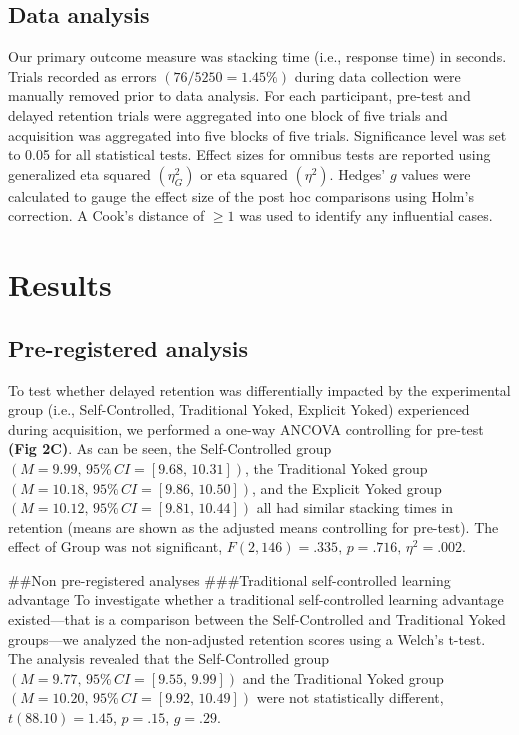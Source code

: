 \documentclass[
  english,
  jou]{apa7}
\begin{document}
\hypertarget{data-analysis}{%
\subsection{Data analysis}\label{data-analysis}}

Our primary outcome measure was stacking time (i.e., response time) in seconds. Trials recorded as errors \((76/5250 = 1.45\%)\) during data collection were manually removed prior to data analysis. For each participant, pre-test and delayed retention trials were aggregated into one block of five trials and acquisition was aggregated into five blocks of five trials. Significance level was set to 0.05 for all statistical tests. Effect sizes for omnibus tests are reported using generalized eta squared \((\eta^2_{G})\) or eta squared \((\eta^2)\). Hedges' \(g\) values were calculated to gauge the effect size of the post hoc comparisons using Holm's correction. A Cook's distance of \(\geq 1\) was used to identify any influential cases.

\hypertarget{results}{%
\section{Results}\label{results}}

\hypertarget{pre-registered-analysis}{%
\subsection{Pre-registered analysis}\label{pre-registered-analysis}}

To test whether delayed retention was differentially impacted by the experimental group (i.e., Self-Controlled, Traditional Yoked, Explicit Yoked) experienced during acquisition, we performed a one-way ANCOVA controlling for pre-test \textbf{(Fig 2C)}. As can be seen, the Self-Controlled group \((M = 9.99, \,95\% \,CI = [9.68, \,10.31])\), the Traditional Yoked group \((M = 10.18, \,95\% \,CI = [9.86, \,10.50])\), and the Explicit Yoked group \((M = 10.12, \,95\% \,CI = [9.81, \,10.44])\) all had similar stacking times in retention (means are shown as the adjusted means controlling for pre-test). The effect of Group was not significant, \(F(2, 146) = .335, \,p = .716, \,\eta^2 = .002\).

\#\#Non pre-registered analyses
\#\#\#Traditional self-controlled learning advantage
To investigate whether a traditional self-controlled learning advantage existed---that is a comparison between the Self-Controlled and Traditional Yoked groups---we analyzed the non-adjusted retention scores using a Welch's t-test. The analysis revealed that the Self-Controlled group \((M = 9.77, \,95\% \,CI = [9.55, \,9.99])\) and the Traditional Yoked group \((M = 10.20, \,95\% \,CI = [9.92, \,10.49])\) were not statistically different, \(t(88.10) = 1.45, \,p = .15, \,g = .29\).
\end{document}
